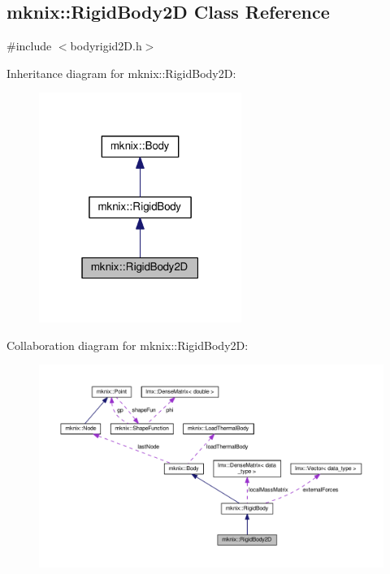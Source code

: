 \hypertarget{classmknix_1_1_rigid_body2_d}{}\subsection{mknix\+:\+:Rigid\+Body2\+D Class Reference}
\label{classmknix_1_1_rigid_body2_d}


{\ttfamily \#include $<$bodyrigid2\+D.\+h$>$}



Inheritance diagram for mknix\+:\+:Rigid\+Body2\+D\+:\nopagebreak
\begin{figure}[H]
\begin{center}
\leavevmode
\includegraphics[width=187pt]{de/d0f/classmknix_1_1_rigid_body2_d__inherit__graph}
\end{center}
\end{figure}


Collaboration diagram for mknix\+:\+:Rigid\+Body2\+D\+:\nopagebreak
\begin{figure}[H]
\begin{center}
\leavevmode
\includegraphics[width=350pt]{d4/d4c/classmknix_1_1_rigid_body2_d__coll__graph}
\end{center}
\end{figure}
